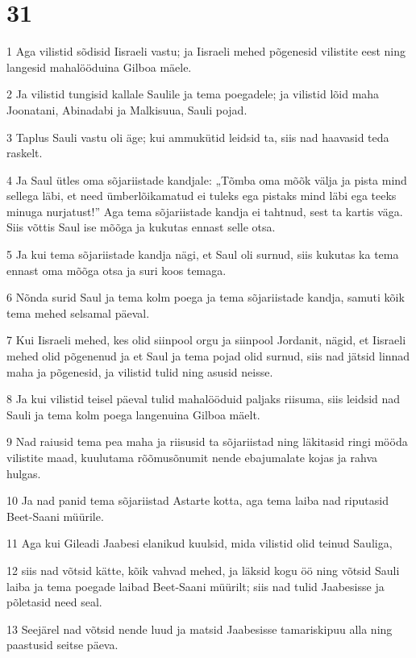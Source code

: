 \chapter{31}

\par 1 Aga vilistid sõdisid Iisraeli vastu; ja Iisraeli mehed põgenesid vilistite eest ning langesid mahalööduina Gilboa mäele.
\par 2 Ja vilistid tungisid kallale Saulile ja tema poegadele; ja vilistid lõid maha Joonatani, Abinadabi ja Malkisuua, Sauli pojad.
\par 3 Taplus Sauli vastu oli äge; kui ammukütid leidsid ta, siis nad haavasid teda raskelt.
\par 4 Ja Saul ütles oma sõjariistade kandjale: „Tõmba oma mõõk välja ja pista mind sellega läbi, et need ümberlõikamatud ei tuleks ega pistaks mind läbi ega teeks minuga nurjatust!” Aga tema sõjariistade kandja ei tahtnud, sest ta kartis väga. Siis võttis Saul ise mõõga ja kukutas ennast selle otsa.
\par 5 Ja kui tema sõjariistade kandja nägi, et Saul oli surnud, siis kukutas ka tema ennast oma mõõga otsa ja suri koos temaga.
\par 6 Nõnda surid Saul ja tema kolm poega ja tema sõjariistade kandja, samuti kõik tema mehed selsamal päeval.
\par 7 Kui Iisraeli mehed, kes olid siinpool orgu ja siinpool Jordanit, nägid, et Iisraeli mehed olid põgenenud ja et Saul ja tema pojad olid surnud, siis nad jätsid linnad maha ja põgenesid, ja vilistid tulid ning asusid neisse.
\par 8 Ja kui vilistid teisel päeval tulid mahalööduid paljaks riisuma, siis leidsid nad Sauli ja tema kolm poega langenuina Gilboa mäelt.
\par 9 Nad raiusid tema pea maha ja riisusid ta sõjariistad ning läkitasid ringi mööda vilistite maad, kuulutama rõõmusõnumit nende ebajumalate kojas ja rahva hulgas.
\par 10 Ja nad panid tema sõjariistad Astarte kotta, aga tema laiba nad riputasid Beet-Saani müürile.
\par 11 Aga kui Gileadi Jaabesi elanikud kuulsid, mida vilistid olid teinud Sauliga,
\par 12 siis nad võtsid kätte, kõik vahvad mehed, ja läksid kogu öö ning võtsid Sauli laiba ja tema poegade laibad Beet-Saani müürilt; siis nad tulid Jaabesisse ja põletasid need seal.
\par 13 Seejärel nad võtsid nende luud ja matsid Jaabesisse tamariskipuu alla ning paastusid seitse päeva.



